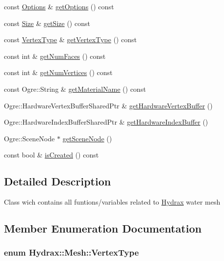\begin{CompactItemize}
\begin{CompactItemize}
\item 
const \hyperlink{struct_hydrax_1_1_mesh_1_1_options}{Options} \& \hyperlink{class_hydrax_1_1_mesh_691d01cdbb82e5d3cd92397fd17d97f6}{getOptions} () const 
\item 
const \hyperlink{struct_hydrax_1_1_size}{Size} \& \hyperlink{class_hydrax_1_1_mesh_4d55461e0da92344146340af91fab715}{getSize} () const 
\item 
const \hyperlink{class_hydrax_1_1_mesh_5409dc682ec836d1922dc193fc1bf559}{VertexType} \& \hyperlink{class_hydrax_1_1_mesh_8da15cd9f0865a0d7a06f899f5b302f5}{getVertexType} () const 
\item 
const int \& \hyperlink{class_hydrax_1_1_mesh_d3b37eaa18198d3f4690bf17877bd61f}{getNumFaces} () const 
\item 
const int \& \hyperlink{class_hydrax_1_1_mesh_ecea28be3ab15b9003565e463f2484e8}{getNumVertices} () const 
\item 
const Ogre::String \& \hyperlink{class_hydrax_1_1_mesh_8445a8603832ae6e003ece91a46627c9}{getMaterialName} () const 
\item 
Ogre::HardwareVertexBufferSharedPtr \& \hyperlink{class_hydrax_1_1_mesh_429bf7b9c15604e6a2e3a988b2473484}{getHardwareVertexBuffer} ()
\item 
Ogre::HardwareIndexBufferSharedPtr \& \hyperlink{class_hydrax_1_1_mesh_b7eee5c0eafda96c493533ae26e73c65}{getHardwareIndexBuffer} ()
\item 
Ogre::SceneNode $\ast$ \hyperlink{class_hydrax_1_1_mesh_92e7428d77bbc71b852a62a92ca882f5}{getSceneNode} ()
\item 
const bool \& \hyperlink{class_hydrax_1_1_mesh_fb24883f62aa72204ed573693ff8bbf7}{isCreated} () const 
\end{CompactItemize}


\subsection{Detailed Description}
Class wich contains all funtions/variables related to \hyperlink{class_hydrax_1_1_hydrax}{Hydrax} water mesh 

\subsection{Member Enumeration Documentation}
\hypertarget{class_hydrax_1_1_mesh_5409dc682ec836d1922dc193fc1bf559}{
\subsubsection[{VertexType}]{\setlength{\rightskip}{0pt plus 5cm}enum {\bf Hydrax::Mesh::VertexType}}}
\label{class_hydrax_1_1_mesh_5409dc682ec836d1922dc193fc1bf559}



\end{CompactItemize}
